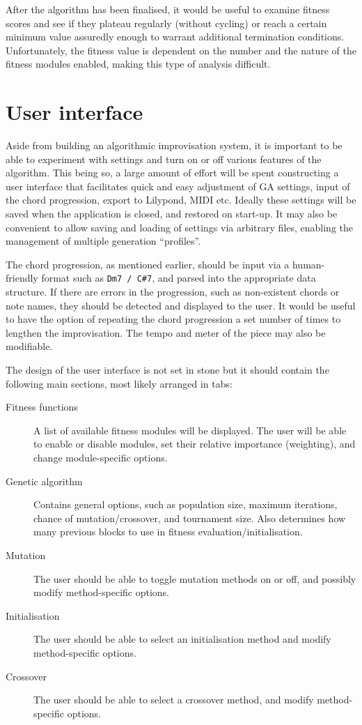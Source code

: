 After the algorithm has been finalised, it would be useful to examine fitness scores and see if they plateau regularly (without cycling) or reach a certain minimum value assuredly enough to warrant additional termination conditions. Unfortunately, the fitness value is dependent on the number and the nature of the fitness modules enabled, making this type of analysis difficult.

\section{User interface}

Aside from building an algorithmic improvisation system, it is important to be able to experiment with settings and turn on or off various features of the algorithm. This being so, a large amount of effort will be spent constructing a user interface that facilitates quick and easy adjustment of GA settings, input of the chord progression, export to Lilypond, MIDI etc. Ideally these settings will be saved when the application is closed, and restored on start-up. It may also be convenient to allow saving and loading of settings via arbitrary files, enabling the management of multiple generation ``profiles''.

The chord progression, as mentioned earlier, should be input via a human-friendly format such as \texttt{Dm7 / C\#7}, and parsed into the appropriate data structure. If there are errors in the progression, such as non-existent chords or note names, they should be detected and displayed to the user. It would be useful to have the option of repeating the chord progression a set number of times to lengthen the improvisation. The tempo and meter of the piece may also be modifiable.

The design of the user interface is not set in stone but it should contain the following main sections, most likely arranged in tabs:

\begin{description}
\item[Fitness functions] A list of available fitness modules will be displayed. The user will be able to enable or disable modules, set their relative importance (weighting), and change module-specific options.
\item[Genetic algorithm] Contains general options, such as population size, maximum iterations, chance of mutation/crossover, and tournament size. Also determines how many previous blocks to use in fitness evaluation/initialisation.
\item[Mutation] The user should be able to toggle mutation methods on or off, and possibly modify method-specific options.
\item[Initialisation] The user should be able to select an initialisation method and modify method-specific options.
\item[Crossover] The user should be able to select a crossover method, and modify method-specific options.
\end{description}


